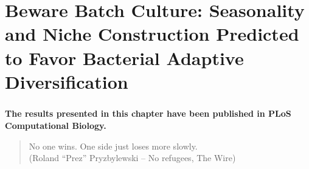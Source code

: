 

\chapter{Beware Batch Culture: Seasonality and Niche Construction Predicted to Favor Bacterial Adaptive Diversification}
\label{ch:part2:first_result}

\paragraph{}
\paragraph{}
\paragraph{}
\paragraph{}
\paragraph{}
\paragraph{}
\paragraph{}
\paragraph{}
\begin{center}
\large \textbf{The results presented in this chapter have been published in PLoS Computational Biology.}
\end{center}

\newpage

\begin{quote}
No one wins. One side just loses more slowly.\\
(Roland ``Prez'' Pryzbylewski -- No refugees, The Wire)
\end{quote}

